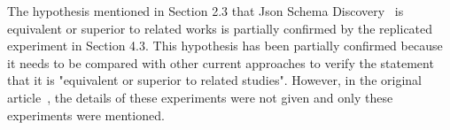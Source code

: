 \documentclass[sigconf, nonacm]{acmart}
\begin{document}
The hypothesis mentioned in Section 2.3 that Json Schema Discovery~\cite{JSONSchemaDiscovery} is equivalent or superior to related works is partially confirmed by the replicated experiment in Section 4.3. This hypothesis has been partially confirmed because it needs to be compared with other current approaches to verify the statement that it is "equivalent or superior to related studies". However, in the original article~\cite{SchemaExtraction}, the details of these experiments were not given and only these experiments were mentioned.




\end{document}
